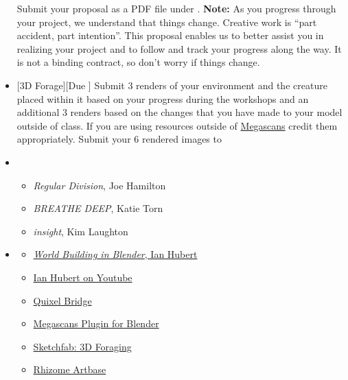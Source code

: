 \begin{itemize}[noitemsep,topsep=0pt,leftmargin=*]
\begin{itemize}
          \end{itemize}
          Submit your proposal as a PDF file under . \newline
          \small{\textbf{Note:} As you progress through your project, we understand that things change. Creative work is ``part accident, part intention''. This proposal enables us to better assist you in realizing your project and to follow and track your progress along the way. It is not a binding contract, so don't worry if things change.}
    \item {}[3D Forage][Due \dSun] Submit 3 renders of your environment and the creature placed within it based on your progress during the workshops and an additional 3 renders based on the changes that you have made to your model outside of class. If you are using resources outside of \href{https://quixel.com/megascans}{Megascans} credit them appropriately. Submit your 6 rendered images to \discordE
    \item {}
          \begin{itemize}
              \item \emph{Regular Division}, Joe Hamilton
              \item \emph{BREATHE DEEP}, Katie Torn
              \item \emph{insight}, Kim Laughton
          \end{itemize}
    \item {}
          \begin{resenv}
              \begin{itemize}
                  \item \href{https://www.youtube.com/watch?v=whPWKecazgM}{\emph{World Building in Blender}, Ian Hubert}
                  \item \href{https://www.youtube.com/channel/UCbmxZRQk-X0p-TOxd6PEYJA}{Ian Hubert on Youtube}
                  \item \href{https://quixel.com/bridge}{Quixel Bridge}
                  \item \href{https://help.quixel.com/hc/en-us/articles/360007480698-Megascans-Plugin-for-Blender}{Megascans Plugin for Blender}
                  \item  \href{https://sketchfab.com/search?features\=downloadable\&q\=scan+heritage\&sort\_by\=-relevance\&type\=models}{Sketchfab: 3D Foraging}
                  \item  \href{https://rhizome.org/art/artbase/}{Rhizome Artbase}
              \end{itemize}
          \end{resenv}
\end{itemize}